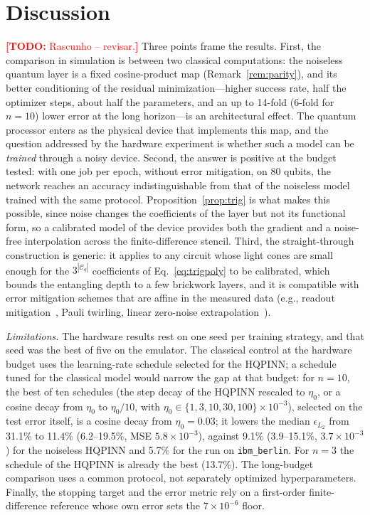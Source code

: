 \documentclass[floatfix,aps,pra,twocolumn,superscriptaddress,10pt,nofootinbib]{revtex4-2}
\newif\ifshowtodos \showtodostrue
\newcommand{\TODO}[1]{\ifshowtodos\textcolor{red}{\textbf{[TODO:} #1\textbf{]}}\fi}
\begin{document}
\newpage
\section{Discussion}\label{sec:discussion}
\TODO{Rascunho -- revisar.} Three points frame the results. First, the comparison in simulation is between two classical computations: the noiseless quantum layer is a fixed cosine-product map (Remark~\ref{rem:parity}), and its better conditioning of the residual minimization---higher success rate, half the optimizer steps, about half the parameters, and an up to 14-fold (6-fold for $n=10$) lower error at the long horizon---is an architectural effect. The quantum processor enters as the physical device that implements this map, and the question addressed by the hardware experiment is whether such a model can be \emph{trained} through a noisy device. Second, the answer is positive at the budget tested: with one job per epoch, without error mitigation, on 80 qubits, the network reaches an accuracy indistinguishable from that of the noiseless model trained with the same protocol. Proposition~\ref{prop:trig} is what makes this possible, since noise changes the coefficients of the layer but not its functional form, so a calibrated model of the device provides both the gradient and a noise-free interpolation across the finite-difference stencil. Third, the straight-through construction is generic: it applies to any circuit whose light cones are small enough for the $3^{|\mathcal C_q|}$ coefficients of Eq.~\eqref{eq:trigpoly} to be calibrated, which bounds the entangling depth to a few brickwork layers, and it is compatible with error mitigation schemes that are affine in the measured data (e.g., readout mitigation~\cite{vandenberg2022model}, Pauli twirling, linear zero-noise extrapolation~\cite{temme2017error}).

\emph{Limitations.} The hardware results rest on one seed per training strategy, and that seed was the best of five on the emulator. The classical control at the hardware budget uses the learning-rate schedule selected for the HQPINN; a schedule tuned for the classical model would narrow the gap at that budget: for $n=10$, the best of ten schedules (the step decay of the HQPINN rescaled to $\eta_0$, or a cosine decay from $\eta_0$ to $\eta_0/10$, with $\eta_0\in\{1,3,10,30,100\}\times10^{-3}$), selected on the test error itself, is a cosine decay from $\eta_0=0.03$; it lowers the median $\epsilon_{L_2}$ from 31.1\% to 11.4\% (6.2--19.5\%, MSE $5.8\times10^{-3}$), against 9.1\% (3.9--15.1\%, $3.7\times10^{-3}$) for the noiseless HQPINN and 5.7\% for the run on \texttt{ibm\_berlin}. For $n=3$ the schedule of the HQPINN is already the best (13.7\%). The long-budget comparison uses a common protocol, not separately optimized hyperparameters. Finally, the stopping target and the error metric rely on a first-order finite-difference reference whose own error sets the $7\times10^{-6}$ floor.
\end{document}
